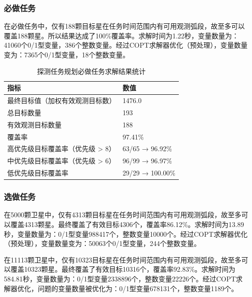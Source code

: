 \documentclass[openany,zihao=-4,UTF8]{ctexart}
\begin{document}
\subsubsection{必做任务}
在必做任务中，仅有188颗目标星在任务时间范围内有可用观测弧段，故至多可以覆盖188颗星。所以结果达成了100\%覆盖率。求解时间为1.22秒，变量数量为：41060个0/1型变量，386个整数变量。经过COPT求解器优化（预处理），变量数量变为：7365个0/1型变量，18个整数变量。
\begin{table}[h]
    \centering
    \caption{探测任务规划必做任务求解结果统计}
    \label{tab:探测任务规划必做任务求解结果统计}
    \begin{tabularx}{0.8\columnwidth}{Xl}
        \toprule
        \textbf{指标}        & \textbf{数值}      \\
        \midrule
        最终目标值（加权有效观测目标数）   & 1476.0           \\
        总目标数量              & 193              \\
        有效观测目标数量           & 188              \\
        覆盖率                & 97.41\%          \\
        高优先级目标覆盖率（优先级 > 8） & 63/65 → 96.92\%  \\
        中优先级目标覆盖率（优先级 > 6） & 96/99 → 96.97\%  \\
        低优先级目标覆盖率          & 29/29 → 100.00\% \\
        \bottomrule
    \end{tabularx}
\end{table}

\subsubsection{选做任务}
在5000颗卫星中，仅有4313颗目标星在任务时间范围内有可用观测弧段，故至多可以覆盖4313颗星。最终覆盖了有效目标4306个，覆盖率86.12\%。求解时间为13.89秒，变量数量为：0/1型变量988417个，整数变量10000个。经过COPT求解器优化（预处理），变量数量变为：50063个0/1型变量，244个整数变量。

在11113颗卫星中，仅有10323目标星在任务时间范围内有可用观测弧段，故至多可以覆盖10323颗星。最终覆盖了有效目标10316个，覆盖率92.83\%。求解时间为584.81秒，变量数量为：0/1型变量2338896个，整数变量22226个。经过COPT求解器优化，问题的变量数量被优化为：0/1型变量678131个，整数变量1189个。
\end{document}
